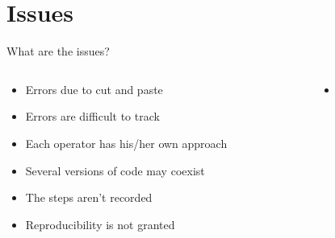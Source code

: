 \documentclass[xcolor=x11names,compress, aspectratio=169]{beamer}
\renewcommand{\(}{\begin{columns}}
\renewcommand{\)}{\end{columns}}
\newcommand{\<}[1]{\begin{column}{#1}}
\renewcommand{\>}{\end{column}}
\begin{document}
\section{Issues}

\begin{frame}{What are the issues?}
  \begin{columns}[T]
    \begin{column}{0.5\textwidth}
      \begin{itemize}[<+->]
        \item Errors due to cut and paste
        \item Errors are difficult to track
        \item Each operator has his/her own approach
        \item Several versions of code may coexist
        \item The steps aren't recorded
        \item Reproducibility is not granted
      \end{itemize}
    \end{column}
    \begin{column}{0.5\textwidth}
    \begin{itemize}
        \item[]  

\end{itemize}
\end{column}
\end{columns}
\end{frame}
\end{document}
